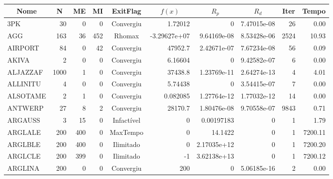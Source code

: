 \begin{center}
\begin{longtable}{|l|r|r|r|c|r|r|r|r|r|} \hline
\multicolumn{1}{|c}{\bf Nome} &
\multicolumn{1}{|c}{\bf N} &
\multicolumn{1}{|c}{\bf ME} &
\multicolumn{1}{|c}{\bf MI} &
\multicolumn{1}{|c}{\bf ExitFlag} &
\multicolumn{1}{|c}{\bf $f(x)$} &
\multicolumn{1}{|c}{\bf $R_p$} &
\multicolumn{1}{|c}{\bf $R_d$} &
\multicolumn{1}{|c}{\bf Iter} &
\multicolumn{1}{|c|}{\bf Tempo} \\ \hline
     3PK &     30 &      0 &      0 & Convergiu  &     1.72012 &              0 & 7.47015e-08 &     26 &    0.00 \\ \hline
     AGG &    163 &     36 &    452 & Rhomax     & -3.29627e+07 &    9.64169e-08 & 8.53428e-06 &   2524 &   10.93 \\ \hline
 AIRPORT &     84 &      0 &     42 & Convergiu  &     47952.7 &    2.42671e-07 & 7.67234e-08 &     56 &    0.09 \\ \hline
   AKIVA &      2 &      0 &      0 & Convergiu  &     6.16604 &              0 & 9.42582e-07 &      6 &    0.00 \\ \hline
ALJAZZAF &   1000 &      1 &      0 & Convergiu  &     37438.8 &    1.23769e-11 & 2.64274e-13 &      4 &    4.01 \\ \hline
ALLINITU &      4 &      0 &      0 & Convergiu  &     5.74438 &              0 & 3.54415e-07 &      7 &    0.00 \\ \hline
ALSOTAME &      2 &      1 &      0 & Convergiu  &    0.082085 &    1.27764e-12 & 1.77032e-12 &     14 &    0.00 \\ \hline
 ANTWERP &     27 &      8 &      2 & Convergiu  &     28170.7 &    1.80476e-08 & 9.70558e-07 &   9843 &    0.71 \\ \hline
 ARGAUSS &      3 &     15 &      0 & Infactível &           0 &     0.00197183 &           0 &      1 &    1.79 \\ \hline
 ARGLALE &    200 &    400 &      0 & MaxTempo   &           0 &        14.1422 &           0 &      1 & 7200.11 \\ \hline
 ARGLBLE &    200 &    400 &      0 & Ilimitado  &           0 &    2.17035e+12 &           0 &      1 & 7200.20 \\ \hline
 ARGLCLE &    200 &    399 &      0 & Ilimitado  &          -1 &    3.62138e+13 &           0 &      1 & 7200.12 \\ \hline
 ARGLINA &    200 &      0 &      0 & Convergiu  &         200 &              0 & 5.06185e-16 &      2 &    0.00 \\ \hline

\end{longtable}
\end{center}
